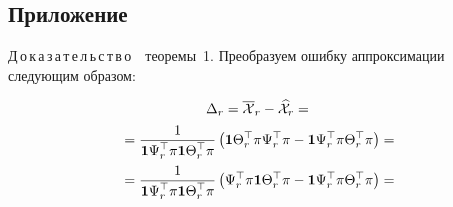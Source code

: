 \begin{multicols}{2}
\vspace*{-6pt}

{\small 
\subsection*{\raggedleft Приложение}



\noindent
Д\,о\,к\,а\,з\,а\,т\,е\,л\,ь\,с\,т\,в\,о\ \ тео\-ре\-мы~1.
Преобразуем ошиб\-ку аппроксимации сле\-ду\-ющим образом:

\noindent
\begin{multline*}
\Delta_r = \overline{\mathcal{X}}_r - \widehat{\mathcal{X}}_r ={}\\
{}= 
\displaystyle\frac{\displaystyle 1\mathstrut}{\displaystyle \mathbf{1}\Psi_r^{\top}\pi \mathbf{1}\Theta_r^{\top}\pi\mathstrut}
\left(\mathbf{1}\Theta_r^{\top}\pi \Psi_r^{\top}\pi - \mathbf{1}\Psi_r^{\top}\pi 
\Theta_r^{\top}\pi\right) ={}\\
{}=
\displaystyle\frac{\displaystyle 1\mathstrut}{\displaystyle \mathbf{1}\Psi_r^{\top}\pi \mathbf{1}\Theta_r^{\top}\pi\mathstrut}
\left(\Psi_r^{\top}\pi\mathbf{1} \Theta_r^{\top}\pi - \mathbf{1}\Psi_r^{\top}\pi 
\Theta_r^{\top}\pi \right) ={} 
\end{multline*}

}
\end{multicols}

